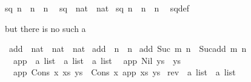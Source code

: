 \begin{isabellebody}
{\isachardoublequoteopen}sq\ n\ {\isacharequal}{\kern0pt}\ n\ {\isacharasterisk}{\kern0pt}\ n{\isachardoublequoteclose}\ \isanewline
\isanewline
{}\isamarkupfalse%
\ sq{\isacharprime}{\kern0pt}\ {\isacharcolon}{\kern0pt}{\isacharcolon}{\kern0pt}\ {\isachardoublequoteopen}nat\ {\isasymRightarrow}\ nat{\isachardoublequoteclose}\ \isanewline
{\isachardoublequoteopen}sq{\isacharprime}{\kern0pt}\ n\ {\isasymequiv}\ n\ {\isacharasterisk}{\kern0pt}\ n{\isachardoublequoteclose}\ \isanewline
\isanewline
{}\isamarkupfalse%
\ sq{\isacharunderscore}{\kern0pt}def%
\begin{isamarkuptext}%
but there is no such a %
\end{isamarkuptext}\isamarkuptrue%
\isamarkupfalse%
\ add\ {\isacharcolon}{\kern0pt}{\isacharcolon}{\kern0pt}\ {\isachardoublequoteopen}nat\ {\isasymRightarrow}\ nat\ {\isasymRightarrow}\ nat{\isachardoublequoteclose}\ \isanewline
{\isachardoublequoteopen}add\ {}\ n\ {\isacharequal}{\kern0pt}\ n{\isachardoublequoteclose}\ {\isacharbar}{\kern0pt}\isanewline
{\isachardoublequoteopen}add\ {\isacharparenleft}{\kern0pt}Suc\ m{\isacharparenright}{\kern0pt}\ n\ {\isacharequal}{\kern0pt}\ Suc{\isacharparenleft}{\kern0pt}add\ m\ n{\isacharparenright}{\kern0pt}{\isachardoublequoteclose}\isanewline
\isanewline
{}\isamarkupfalse%
\isanewline
\ \ app\ {\isacharcolon}{\kern0pt}{\isacharcolon}{\kern0pt}\ {\isachardoublequoteopen}{\isacharprime}{\kern0pt}a\ list\ {\isacharequal}{\kern0pt}{\isachargreater}{\kern0pt}\ {\isacharprime}{\kern0pt}a\ list\ {\isacharequal}{\kern0pt}{\isachargreater}{\kern0pt}\ {\isacharprime}{\kern0pt}a\ list{\isachardoublequoteclose}\isanewline
{}\isanewline
\ \ {\isachardoublequoteopen}app\ Nil\ ys\ {\isacharequal}{\kern0pt}\ ys{\isachardoublequoteclose}\ {\isacharbar}{\kern0pt}\isanewline
\ \ {\isachardoublequoteopen}app\ {\isacharparenleft}{\kern0pt}Cons\ x\ xs{\isacharparenright}{\kern0pt}\ ys\ {\isacharequal}{\kern0pt}\ Cons\ x\ {\isacharparenleft}{\kern0pt}app\ xs\ ys{\isacharparenright}{\kern0pt}{\isachardoublequoteclose}\isanewline
\isanewline
{}\isamarkupfalse%
\isanewline
\isanewline
{}\isamarkupfalse%
\ rev{}\ {\isacharcolon}{\kern0pt}{\isacharcolon}{\kern0pt}\ {\isachardoublequoteopen}{\isacharprime}{\kern0pt}a\ list\ {\isasymRightarrow}\ {\isacharprime}{\kern0pt}a\ list{\isachardoublequoteclose}\ \isanewline

\end{isabellebody}

